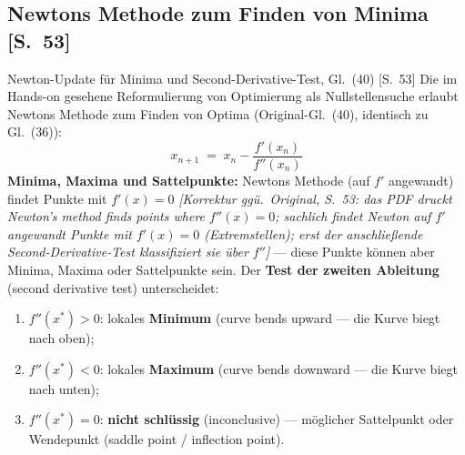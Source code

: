 \subsection{Newtons Methode zum Finden von Minima [S.~53]}

\begin{satzbox}{Newton-Update für Minima und Second-Derivative-Test, Gl.~(40) [S.~53]}
Die im Hands-on gesehene Reformulierung von Optimierung als Nullstellensuche erlaubt
Newtons Methode zum Finden von Optima (Original-Gl.~(40), identisch zu Gl.~(36)):
\[
  x_{n+1} \;=\; x_n - \frac{f'(x_n)}{f''(x_n)} \tag{40}
\]
\textbf{Minima, Maxima und Sattelpunkte:} Newtons Methode (auf $f'$ angewandt) findet
Punkte mit $f'(x) = 0$ \emph{[Korrektur ggü.\ Original, S.~53: das PDF druckt
\glqq Newton's method finds points where $f''(x) = 0$\grqq; sachlich findet Newton auf
$f'$ angewandt Punkte mit $f'(x) = 0$ (Extremstellen); erst der anschlie{\ss}ende
Second-Derivative-Test klassifiziert sie über $f''$]} --- diese Punkte können aber
Minima, Maxima oder Sattelpunkte sein. Der \textbf{Test der zweiten Ableitung}
(second derivative test) unterscheidet:
\begin{enumerate}[label=(\alph*),itemsep=1pt]
  \item $f''(x^{*}) > 0$: lokales \textbf{Minimum} (\glqq curve bends upward\grqq{} ---
        die Kurve biegt nach oben);
  \item $f''(x^{*}) < 0$: lokales \textbf{Maximum} (\glqq curve bends downward\grqq{} ---
        die Kurve biegt nach unten);
  \item $f''(x^{*}) = 0$: \textbf{nicht schlüssig} (inconclusive) --- möglicher
        Sattelpunkt oder Wendepunkt (saddle point / inflection point).
\end{enumerate}
\end{satzbox}

